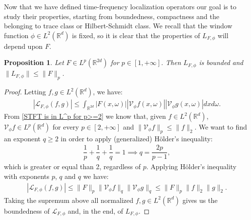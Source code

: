 \documentclass[corpo=11pt, stile=classica, tipotesi=custom,
greek, evenboxes, english]{toptesi}
\numberwithin{equation}{chapter}
\newtheorem{prop}[teo]{Proposition}
\theoremstyle{definition}
\theoremstyle{remark}
\newcommand{\R}{\mathbb{R}} %
\newcommand{\V}{\mathcal{V}} %
\renewcommand{\L}{\mathscr{L}} %
\begin{document}
Now that we have defined time-frequency localization operators our goal is to study their properties, starting from boundedness, compactness and the belonging to trace class or Hilbert-Schmidt class. We recall that the window function $\phi \in L^2(\R^d)$ is fixed, so it is clear that the properties of $L_{F,\phi}$ will depend upon $F$.
\begin{prop}\label{F in L^p L_F bounded}
	Let $F \in L^p(\R^{2d})$ for $p \in [1,+\infty]$. Then $L_{F,\phi}$ is bounded and $\|L_{F,\phi}\| \leq \|F\|_p$.
\end{prop}
\begin{proof}
	Letting $f,g \in L^2(\R^d)$, we have:
	\begin{align*}
		|\L_{F,\phi} (f,g)| \leq \int_{\R^{2d}} |F(x,\omega)| |\V_{\phi}f(x,\omega)| |\V_{\phi}g(x,\omega)| dxd\omega.
	\end{align*}
	From \eqref{STFT is in L^p for p>=2} we know that, given $f \in L^2(\R^d)$, $\V_{\phi} f \in L^p(\R^d)$ for every $p \in [2,+\infty]$ and $\|\V_{\phi} f\|_p \leq \|f\|_2$. We want to find an exponent $q \geq 2$ in order to apply (generalized) H\"older's inequality:
	\begin{align*}
		\dfrac{1}{p} + \dfrac{1}{q} + \dfrac{1}{q} = 1 \implies q =  \dfrac{2p}{p-1},
	\end{align*}
	which is greater or equal than 2, regardless of $p$. Applying H\"older's inequality with exponents $p$, $q$ and $q$ we have:
	\begin{align*}
		|\L_{F,\phi} (f,g)| \leq \|F\|_p \|\V_{\phi}f\|_q \|\V_{\phi}g\|_q \leq \|F\|_p \|f\|_2 \|g\|_2.
	\end{align*}
	Taking the supremum above all normalized $f,g \in L^2(\R^d)$ gives us the boundedness of $\L_{F,\phi}$ and, in the end, of $L_{F,\phi}$.
\end{proof}
\end{document}
